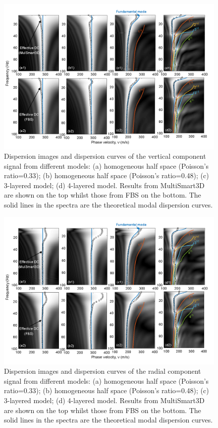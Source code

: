 \begin{figure}[h]
    \centering
    \includegraphics[scale=0.3]{images/DCvertical.png}
    \caption{Dispersion images and dispersion curves of the vertical component signal from different models: (a) homogeneous half space (Poisson's ratio=0.33); (b) homogeneous half space (Poisson's ratio=0.48); (c) 3-layered model; (d) 4-layered model. Results from MultiSmart3D are shown on the top whilst those from FBS on the bottom. The solid lines in the spectra are the theoretical modal dispersion curves.}
    \label{fig:DCvertical}
\end{figure}
\hfill
\begin{figure}[h]
    \centering
    \includegraphics[scale=0.3]{images/DChorz.png}
    \caption{Dispersion images and dispersion curves of the radial component signal from different models: (a) homogeneous half space (Poisson's ratio=0.33); (b) homogeneous half space (Poisson's ratio=0.48); (c) 3-layered model; (d) 4-layered model. Results from MultiSmart3D are shown on the top whilst those from FBS on the bottom. The solid lines in the spectra are the theoretical modal dispersion curves.}
    \label{fig:DChorz}
\end{figure}

